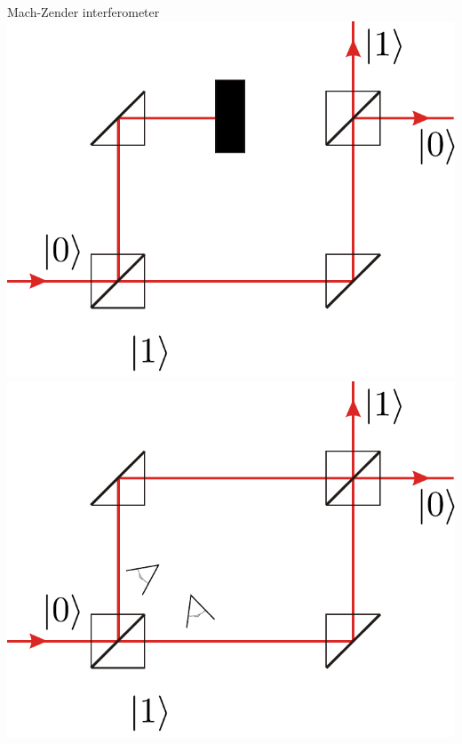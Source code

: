 \begin{frame}[allowframebreaks]{Mach-Zender interferometer}
    \includegraphics[width=\wdth]{pics/bombs/Mach-Zehnder_interferometer_pomiar_1}\\
    \includegraphics[width=\wdth]{pics/bombs/Mach-Zehnder_interferometer_pomiar_2}\\
\end{frame}
